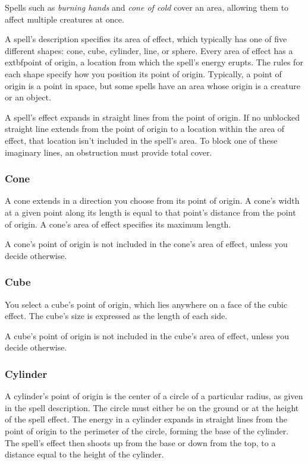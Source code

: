 Spells such as \textit{burning hands} and \textit{cone of cold} cover an area, allowing them to affect multiple creatures at once.

A spell's description specifies its area of effect, which typically has one of five different shapes: cone, cube, cylinder, line, or sphere. Every area of effect has a 	extbf{point of origin}, a location from which the spell's energy erupts. The rules for each shape specify how you position its point of origin. Typically, a point of origin is a point in space, but some spells have an area whose origin is a creature or an object.

A spell's effect expands in straight lines from the point of origin. If no unblocked straight line extends from the point of origin to a location within the area of effect, that location isn't included in the spell's area. To block one of these imaginary lines, an obstruction must provide total cover.

\subsubsection{Cone}

A cone extends in a direction you choose from its point of origin. A cone's width at a given point along its length is equal to that point's distance from the point of origin. A cone's area of effect specifies its maximum length.

A cone's point of origin is not included in the cone's area of effect, unless you decide otherwise.

\subsubsection{Cube}

You select a cube's point of origin, which lies anywhere on a face of the cubic effect. The cube's size is expressed as the length of each side.

A cube's point of origin is not included in the cube's area of effect, unless you decide otherwise.

\subsubsection{Cylinder}

A cylinder's point of origin is the center of a circle of a particular radius, as given in the spell description. The circle must either be on the ground or at the height of the spell effect. The energy in a cylinder expands in straight lines from the point of origin to the perimeter of the circle, forming the base of the cylinder. The spell's effect then shoots up from the base or down from the top, to a distance equal to the height of the cylinder.

